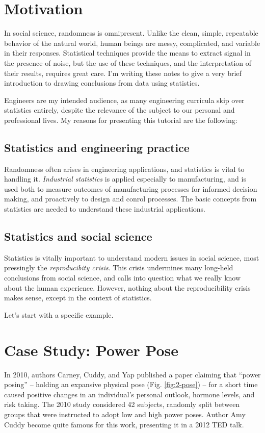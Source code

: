 \documentclass{tufte-handout}
\begin{document}
\section{Motivation}
\label{sec:org20fc1d2}
In social science, randomness is omnipresent. Unlike the clean, simple,
repeatable behavior of the natural world, human beings are messy, complicated,
and variable in their responses. Statistical techniques provide the means to
extract signal in the presence of noise, but the use of these techniques, and
the interpretation of their results, requires great care. I'm writing these
notes to give a very brief introduction to drawing conclusions from data using
statistics.

Engineers are my intended audience, as many engineering curricula skip over
statistics entirely, despite the relevance of the subject to our personal and
professional lives. My reasons for presenting this tutorial are the following:

\subsection{Statistics and engineering practice}
\label{sec:org4569205}
Randomness often arises in engineering applications, and statistics is vital to
handling it. \emph{Industrial statistics} is applied especially to manufacturing, and
is used both to measure outcomes of manufacturing processes for informed
decision making, and proactively to design and conrol processes. The basic
concepts from statistics are needed to understand these industrial applications.

\subsection{Statistics and social science}
\label{sec:org7acb248}
Statistics is vitally important to understand modern issues in social science,
most pressingly the \emph{reproducibity crisis}.\cite{open2015estimating} This crisis
undermines many long-held conclusions from social science, and calls into
question what we really know about the human experience. However, nothing about
the reproducibility crisis makes sense, except in the context of statistics.

Let's start with a specific example.
\section{Case Study: Power Pose}
\label{sec:org0267b1e}
In 2010, authors Carney, Cuddy, and Yap \cite{carney2010power} published a paper
claiming that ``power posing'' -- holding an expansive physical pose (Fig.
\ref{fig:2-pose}) -- for a short time caused positive changes in an individual's
personal outlook, hormone levels, and risk taking. The 2010 study considered 42
subjects, randomly split between groups that were instructed to adopt low and
high power poses. Author Amy Cuddy \cite{cuddy2012ted} become quite famous for
this work, presenting it in a 2012 TED talk.
\end{document}
